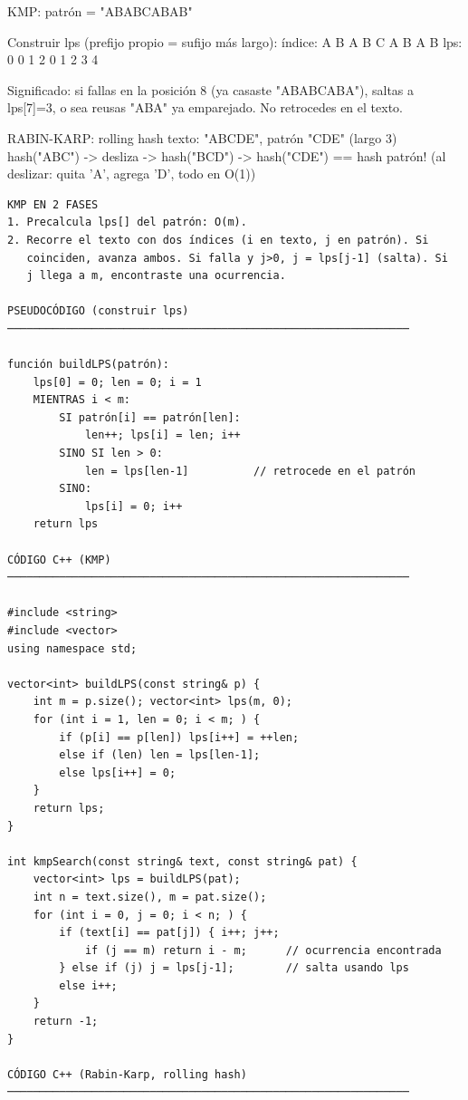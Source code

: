 \begin{dsadiagrama}
KMP: patrón = "ABABCABAB"

Construir lps (prefijo propio = sufijo más largo):
  índice:  A  B  A  B  C  A  B  A  B
  lps:     0  0  1  2  0  1  2  3  4

Significado: si fallas en la posición 8 (ya casaste "ABABCABA"),
saltas a lps[7]=3, o sea reusas "ABA" ya emparejado. No retrocedes
en el texto.

RABIN-KARP: rolling hash
  texto: "ABCDE",  patrón "CDE" (largo 3)
  hash("ABC") -> desliza -> hash("BCD") -> hash("CDE") == hash patrón!
  (al deslizar: quita 'A', agrega 'D', todo en O(1))
\end{dsadiagrama}

\begin{lstlisting}
KMP EN 2 FASES
1. Precalcula lps[] del patrón: O(m).
2. Recorre el texto con dos índices (i en texto, j en patrón). Si
   coinciden, avanza ambos. Si falla y j>0, j = lps[j-1] (salta). Si
   j llega a m, encontraste una ocurrencia.

PSEUDOCÓDIGO (construir lps)
──────────────────────────────────────────────────────────────

función buildLPS(patrón):
    lps[0] = 0; len = 0; i = 1
    MIENTRAS i < m:
        SI patrón[i] == patrón[len]:
            len++; lps[i] = len; i++
        SINO SI len > 0:
            len = lps[len-1]          // retrocede en el patrón
        SINO:
            lps[i] = 0; i++
    return lps

CÓDIGO C++ (KMP)
──────────────────────────────────────────────────────────────

#include <string>
#include <vector>
using namespace std;

vector<int> buildLPS(const string& p) {
    int m = p.size(); vector<int> lps(m, 0);
    for (int i = 1, len = 0; i < m; ) {
        if (p[i] == p[len]) lps[i++] = ++len;
        else if (len) len = lps[len-1];
        else lps[i++] = 0;
    }
    return lps;
}

int kmpSearch(const string& text, const string& pat) {
    vector<int> lps = buildLPS(pat);
    int n = text.size(), m = pat.size();
    for (int i = 0, j = 0; i < n; ) {
        if (text[i] == pat[j]) { i++; j++;
            if (j == m) return i - m;      // ocurrencia encontrada
        } else if (j) j = lps[j-1];        // salta usando lps
        else i++;
    }
    return -1;
}

CÓDIGO C++ (Rabin-Karp, rolling hash)
──────────────────────────────────────────────────────────────


\end{lstlisting}
